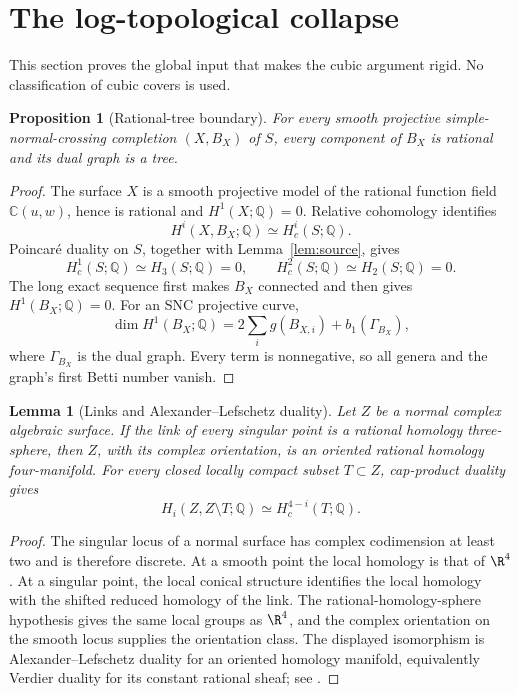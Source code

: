 \documentclass[11pt]{article}
\newtheorem{proposition}[theorem]{Proposition}
\newtheorem{lemma}[theorem]{Lemma}
\theoremstyle{definition}
\theoremstyle{remark}
\newcommand{\C}{\mathbb C}
\newcommand{\Q}{\mathbb Q}
\begin{document}
\section{The log-topological collapse}

This section proves the global input that makes the cubic argument
rigid.  No classification of cubic covers is used.

\begin{proposition}[Rational-tree boundary]\label{prop:rational-tree}
For every smooth projective simple-normal-crossing completion
\((X,B_X)\) of \(S\), every component of \(B_X\) is rational and its
dual graph is a tree.
\end{proposition}

\begin{proof}
The surface \(X\) is a smooth projective model of the rational function
field \(\C(u,w)\), hence is rational and
\(H^1(X;\Q)=0\).  Relative cohomology identifies
\[
 H^i(X,B_X;\Q)\simeq H_c^i(S;\Q).
\]
Poincar\'e duality on \(S\), together with
Lemma~\ref{lem:source}, gives
\[
 H_c^1(S;\Q)\simeq H_3(S;\Q)=0,\qquad
 H_c^2(S;\Q)\simeq H_2(S;\Q)=0.
\]
The long exact sequence first makes \(B_X\) connected and then gives
\(H^1(B_X;\Q)=0\).  For an SNC projective curve,
\[
 \dim H^1(B_X;\Q)
 =2\sum_i g(B_{X,i})+b_1(\Gamma_{B_X}),
\]
where \(\Gamma_{B_X}\) is the dual graph.  Every term is nonnegative,
so all genera and the graph's first Betti number vanish.
\end{proof}

\begin{lemma}[Links and Alexander--Lefschetz duality]
\label{lem:alexander}
Let \(Z\) be a normal complex algebraic surface.  If the link of every
singular point is a rational homology three-sphere, then \(Z\), with
its complex orientation, is an oriented rational homology
four-manifold.  For every closed locally compact subset \(T\subset Z\),
cap-product duality gives
\[
 H_i(Z,Z\setminus T;\Q)\simeq H_c^{4-i}(T;\Q).
 \tag{3.0}
\]
\end{lemma}

\begin{proof}
The singular locus of a normal surface has complex codimension at
least two and is therefore discrete.  At a smooth point the local
homology is that of \(\R^4\).  At a singular point, the local conical
structure identifies the local homology with the shifted reduced
homology of the link.  The rational-homology-sphere hypothesis gives
the same local groups as \(\R^4\), and the complex orientation on the
smooth locus supplies the orientation class.  The displayed
isomorphism is Alexander--Lefschetz duality for an oriented homology
manifold, equivalently Verdier duality for its constant rational
sheaf; see \cite[Chapter~3]{Dimca}.
\end{proof}
\end{document}
